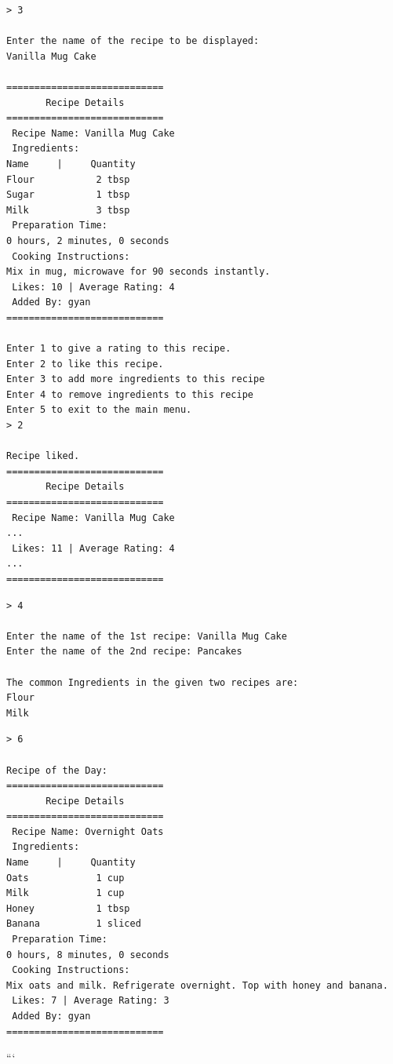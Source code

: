 \documentclass[12pt, a4paper]{article}
\begin{document}
\begin{terminalbox}
\begin{verbatim}
> 3

Enter the name of the recipe to be displayed:
Vanilla Mug Cake

============================
       Recipe Details       
============================
 Recipe Name: Vanilla Mug Cake
 Ingredients:
Name     |     Quantity
Flour           2 tbsp
Sugar           1 tbsp
Milk            3 tbsp
 Preparation Time: 
0 hours, 2 minutes, 0 seconds
 Cooking Instructions: 
Mix in mug, microwave for 90 seconds instantly.
 Likes: 10 | Average Rating: 4
 Added By: gyan
============================

Enter 1 to give a rating to this recipe.
Enter 2 to like this recipe.
Enter 3 to add more ingredients to this recipe
Enter 4 to remove ingredients to this recipe
Enter 5 to exit to the main menu.
> 2

Recipe liked.
============================
       Recipe Details       
============================
 Recipe Name: Vanilla Mug Cake
...
 Likes: 11 | Average Rating: 4
...
============================
\end{verbatim}
\end{terminalbox}

\begin{terminalbox}
\begin{verbatim}
> 4

Enter the name of the 1st recipe: Vanilla Mug Cake
Enter the name of the 2nd recipe: Pancakes

The common Ingredients in the given two recipes are:
Flour
Milk
\end{verbatim}
\end{terminalbox}

\begin{terminalbox}
\begin{verbatim}
> 6

Recipe of the Day: 
============================
       Recipe Details       
============================
 Recipe Name: Overnight Oats
 Ingredients:
Name     |     Quantity
Oats            1 cup
Milk            1 cup
Honey           1 tbsp
Banana          1 sliced
 Preparation Time: 
0 hours, 8 minutes, 0 seconds
 Cooking Instructions: 
Mix oats and milk. Refrigerate overnight. Top with honey and banana.
 Likes: 7 | Average Rating: 3
 Added By: gyan
============================
\end{verbatim}
\end{terminalbox}
```
\end{document}
